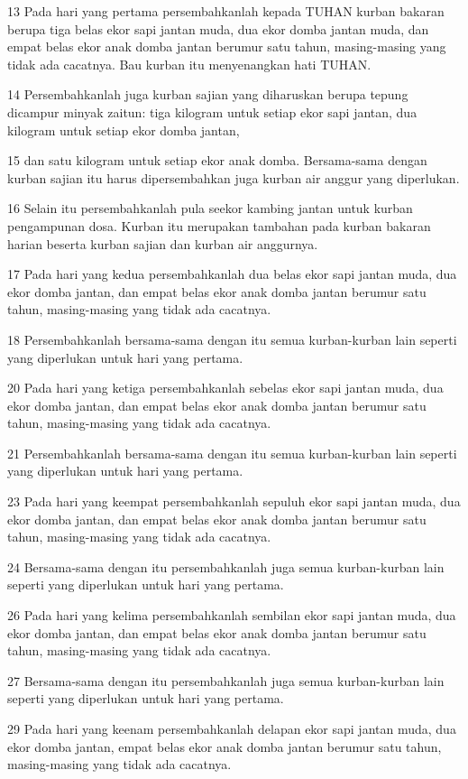 \par 13 Pada hari yang pertama persembahkanlah kepada TUHAN kurban bakaran berupa tiga belas ekor sapi jantan muda, dua ekor domba jantan muda, dan empat belas ekor anak domba jantan berumur satu tahun, masing-masing yang tidak ada cacatnya. Bau kurban itu menyenangkan hati TUHAN.
\par 14 Persembahkanlah juga kurban sajian yang diharuskan berupa tepung dicampur minyak zaitun: tiga kilogram untuk setiap ekor sapi jantan, dua kilogram untuk setiap ekor domba jantan,
\par 15 dan satu kilogram untuk setiap ekor anak domba. Bersama-sama dengan kurban sajian itu harus dipersembahkan juga kurban air anggur yang diperlukan.
\par 16 Selain itu persembahkanlah pula seekor kambing jantan untuk kurban pengampunan dosa. Kurban itu merupakan tambahan pada kurban bakaran harian beserta kurban sajian dan kurban air anggurnya.
\par 17 Pada hari yang kedua persembahkanlah dua belas ekor sapi jantan muda, dua ekor domba jantan, dan empat belas ekor anak domba jantan berumur satu tahun, masing-masing yang tidak ada cacatnya.
\par 18 Persembahkanlah bersama-sama dengan itu semua kurban-kurban lain seperti yang diperlukan untuk hari yang pertama.
\par 20 Pada hari yang ketiga persembahkanlah sebelas ekor sapi jantan muda, dua ekor domba jantan, dan empat belas ekor anak domba jantan berumur satu tahun, masing-masing yang tidak ada cacatnya.
\par 21 Persembahkanlah bersama-sama dengan itu semua kurban-kurban lain seperti yang diperlukan untuk hari yang pertama.
\par 23 Pada hari yang keempat persembahkanlah sepuluh ekor sapi jantan muda, dua ekor domba jantan, dan empat belas ekor anak domba jantan berumur satu tahun, masing-masing yang tidak ada cacatnya.
\par 24 Bersama-sama dengan itu persembahkanlah juga semua kurban-kurban lain seperti yang diperlukan untuk hari yang pertama.
\par 26 Pada hari yang kelima persembahkanlah sembilan ekor sapi jantan muda, dua ekor domba jantan, dan empat belas ekor anak domba jantan berumur satu tahun, masing-masing yang tidak ada cacatnya.
\par 27 Bersama-sama dengan itu persembahkanlah juga semua kurban-kurban lain seperti yang diperlukan untuk hari yang pertama.
\par 29 Pada hari yang keenam persembahkanlah delapan ekor sapi jantan muda, dua ekor domba jantan, empat belas ekor anak domba jantan berumur satu tahun, masing-masing yang tidak ada cacatnya.
